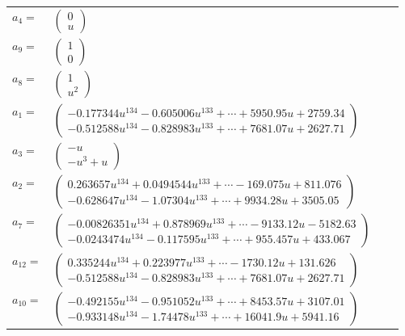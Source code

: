 \documentclass[1p]{elsarticle_modified}
\theoremstyle{definition}
\begin{document}
\begin{tabular}{m{7pt} m{180pt} m{7pt} m{180pt} }
\flushright $a_{4}=$&$\begin{pmatrix}0\\u\end{pmatrix}$ \\
\flushright $a_{9}=$&$\begin{pmatrix}1\\0\end{pmatrix}$ \\
\flushright $a_{8}=$&$\begin{pmatrix}1\\u^2\end{pmatrix}$ \\
\flushright $a_{1}=$&$\begin{pmatrix}-0.177344 u^{134}-0.605006 u^{133}+\cdots+5950.95 u+2759.34\\-0.512588 u^{134}-0.828983 u^{133}+\cdots+7681.07 u+2627.71\end{pmatrix}$ \\
\flushright $a_{3}=$&$\begin{pmatrix}- u\\- u^3+u\end{pmatrix}$ \\
\flushright $a_{2}=$&$\begin{pmatrix}0.263657 u^{134}+0.0494544 u^{133}+\cdots-169.075 u+811.076\\-0.628647 u^{134}-1.07304 u^{133}+\cdots+9934.28 u+3505.05\end{pmatrix}$ \\
\flushright $a_{7}=$&$\begin{pmatrix}-0.00826351 u^{134}+0.878969 u^{133}+\cdots-9133.12 u-5182.63\\-0.0243474 u^{134}-0.117595 u^{133}+\cdots+955.457 u+433.067\end{pmatrix}$ \\
\flushright $a_{12}=$&$\begin{pmatrix}0.335244 u^{134}+0.223977 u^{133}+\cdots-1730.12 u+131.626\\-0.512588 u^{134}-0.828983 u^{133}+\cdots+7681.07 u+2627.71\end{pmatrix}$ \\
\flushright $a_{10}=$&$\begin{pmatrix}-0.492155 u^{134}-0.951052 u^{133}+\cdots+8453.57 u+3107.01\\-0.933148 u^{134}-1.74478 u^{133}+\cdots+16041.9 u+5941.16\end{pmatrix}$ \\

\end{tabular}
\end{document}

